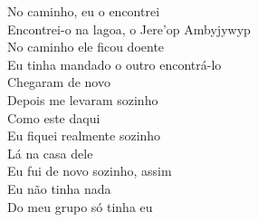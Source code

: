 \bigskip

\begin{linenumbers}\begingroup\raggedright
 
\noindent   No caminho, eu o encontrei\\
  Encontrei-o na lagoa, o Jere'op Ambyjywyp\\
  No caminho ele ficou doente\\
  Eu tinha mandado o outro encontrá-lo\\
  Chegaram de novo\\
  Depois me levaram sozinho\\
  Como este daqui\\
  Eu fiquei realmente sozinho\\
  Lá na casa dele\\
  Eu fui de novo sozinho, assim\\
  Eu não tinha nada\\
  Do meu grupo só tinha eu
 
\end{linenumbers}\endgroup

\bigskip

